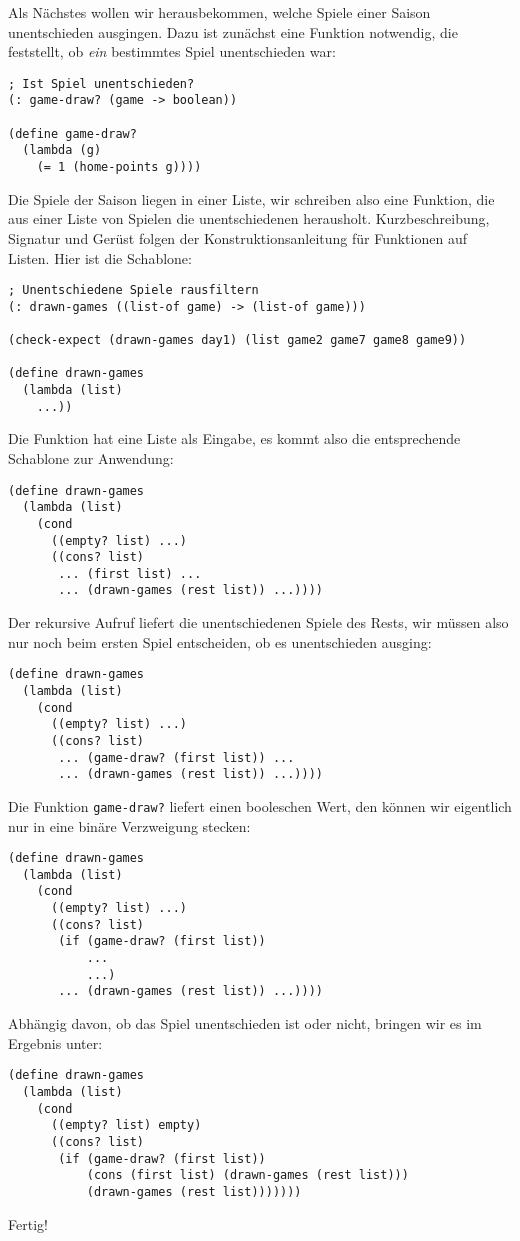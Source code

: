 Als Nächstes wollen wir herausbekommen, welche Spiele einer Saison
unentschieden ausgingen.  Dazu ist zunächst eine Funktion notwendig,
die feststellt, ob \emph{ein} bestimmtes Spiel unentschieden war:
%
\begin{lstlisting}
; Ist Spiel unentschieden?
(: game-draw? (game -> boolean))

(define game-draw?
  (lambda (g)
    (= 1 (home-points g))))
\end{lstlisting}
%
Die Spiele der Saison liegen in einer Liste, wir schreiben also eine
Funktion, die aus einer Liste von Spielen die
unentschiedenen herausholt.  Kurzbeschreibung, Signatur und Gerüst
folgen der Konstruktionsanleitung für Funktionen auf Listen.
Hier ist die Schablone:
%
\begin{lstlisting}
; Unentschiedene Spiele rausfiltern
(: drawn-games ((list-of game) -> (list-of game)))

(check-expect (drawn-games day1) (list game2 game7 game8 game9))

(define drawn-games
  (lambda (list)
    ...))
\end{lstlisting}
%
Die Funktion hat eine Liste als Eingabe, es kommt also die
entsprechende Schablone zur Anwendung:
%
\begin{lstlisting}
(define drawn-games
  (lambda (list)
    (cond
      ((empty? list) ...)
      ((cons? list)
       ... (first list) ...
       ... (drawn-games (rest list)) ...))))
\end{lstlisting}
%
Der rekursive Aufruf liefert die unentschiedenen Spiele des Rests, wir
müssen also nur noch beim ersten Spiel entscheiden, ob es
unentschieden ausging:
%
\begin{lstlisting}
(define drawn-games
  (lambda (list)
    (cond
      ((empty? list) ...)
      ((cons? list)
       ... (game-draw? (first list)) ...
       ... (drawn-games (rest list)) ...))))
\end{lstlisting}
%
Die Funktion \lstinline{game-draw?} liefert einen booleschen Wert,
den können wir eigentlich nur in eine binäre Verzweigung stecken:
%
\begin{lstlisting}
(define drawn-games
  (lambda (list)
    (cond
      ((empty? list) ...)
      ((cons? list)
       (if (game-draw? (first list))
           ...
           ...)
       ... (drawn-games (rest list)) ...))))
\end{lstlisting}
%
Abhängig davon, ob das Spiel unentschieden ist oder nicht, bringen wir
es im Ergebnis unter:
%
\begin{lstlisting}
(define drawn-games
  (lambda (list)
    (cond
      ((empty? list) empty)
      ((cons? list)
       (if (game-draw? (first list))
           (cons (first list) (drawn-games (rest list)))
           (drawn-games (rest list)))))))
\end{lstlisting}
%
Fertig!

